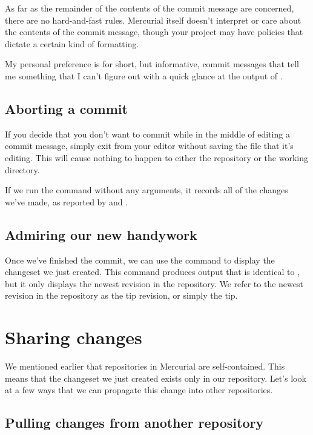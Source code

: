 As far as the remainder of the contents of the commit message are
concerned, there are no hard-and-fast rules.  Mercurial itself doesn't
interpret or care about the contents of the commit message, though
your project may have policies that dictate a certain kind of
formatting.

My personal preference is for short, but informative, commit messages
that tell me something that I can't figure out with a quick glance at
the output of .

\subsection{Aborting a commit}

If you decide that you don't want to commit while in the middle of
editing a commit message, simply exit from your editor without saving
the file that it's editing.  This will cause nothing to happen to
either the repository or the working directory.

If we run the  command without any arguments, it records
all of the changes we've made, as reported by  and
.

\subsection{Admiring our new handywork}

Once we've finished the commit, we can use the  command to
display the changeset we just created.  This command produces output
that is identical to , but it only displays the newest
revision in the repository.
We refer to the newest revision in the repository as the tip revision,
or simply the tip.

\section{Sharing changes}

We mentioned earlier that repositories in Mercurial are
self-contained.  This means that the changeset we just created exists
only in our  repository.  Let's look at a few ways
that we can propagate this change into other repositories.

\subsection{Pulling changes from another repository}
\label{sec:tour:pull}

